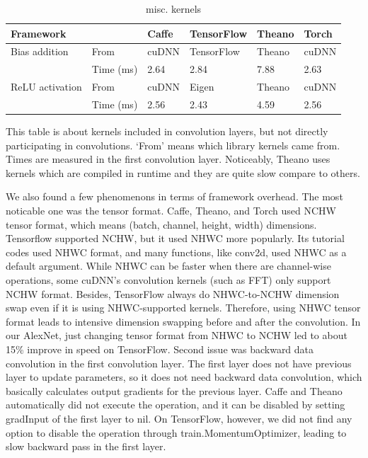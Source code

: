 \begin{table}[]
\centering
\caption{misc. kernels}
\label{table_misc_kernel}
\begin{tabular}{llllll}
\multicolumn{2}{l}{Framework} & Caffe & TensorFlow & Theano & Torch \\ \hline
Bias addition    & From       & cuDNN & TensorFlow & Theano & cuDNN \\
                 & Time (ms)  & 2.64  & 2.84       & 7.88   & 2.63  \\
ReLU activation  & From       & cuDNN & Eigen      & Theano & cuDNN \\
                 & Time (ms)  & 2.56  & 2.43       & 4.59   & 2.56 
\end{tabular}

This table is about kernels included in convolution layers, but not directly participating in convolutions.
`From' means which library kernels came from.
Times are measured in the first convolution layer.
Noticeably, Theano uses kernels which are compiled in runtime and they are quite slow compare to others.
\end{table}

We also found a few phenomenons in terms of framework overhead.
The most noticable one was the tensor format.
Caffe, Theano, and Torch used NCHW tensor format, which means (batch, channel, height, width) dimensions.
Tensorflow supported NCHW, but it used NHWC more popularly.
Its tutorial codes used NHWC format, and many functions, like conv2d, used NHWC as a default argument.
While NHWC can be faster when there are channel-wise operations, some cuDNN's convolution kernels (such as FFT) only support NCHW format.
Besides, TensorFlow always do NHWC-to-NCHW dimension swap even if it is using NHWC-supported kernels.
Therefore, using NHWC tensor format leads to intensive dimension swapping before and after the convolution.
In our AlexNet, just changing tensor format from NHWC to NCHW led to about 15\% improve in speed on TensorFlow.
Second issue was backward data convolution in the first convolution layer.
The first layer does not have previous layer to update parameters, so it does not need backward data convolution, which basically calculates output gradients for the previous layer.
Caffe and Theano automatically did not execute the operation, and it can be disabled by setting gradInput of the first layer to nil.
On TensorFlow, however, we did not find any option to disable the operation through train.MomentumOptimizer, leading to slow backward pass in the first layer.


